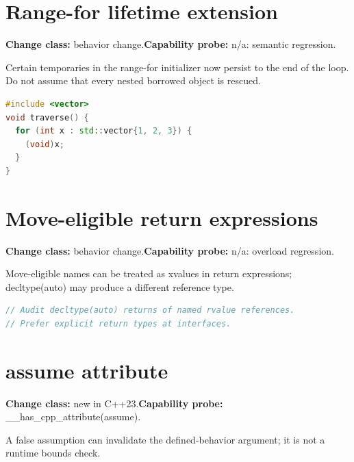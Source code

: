 \documentclass[11pt]{article}
\begin{document}
\section{Range-for lifetime extension}
\textbf{Change class:} behavior change.\quad \textbf{Capability probe:} n/a: semantic regression.

Certain temporaries in the range-for initializer now persist to the end of the loop. Do not assume that every nested borrowed object is rescued.

\begin{lstlisting}[language=C++]
#include <vector>
void traverse() {
  for (int x : std::vector{1, 2, 3}) {
    (void)x;
  }
}
\end{lstlisting}
\section{Move-eligible return expressions}
\textbf{Change class:} behavior change.\quad \textbf{Capability probe:} n/a: overload regression.

Move-eligible names can be treated as xvalues in return expressions; decltype(auto) may produce a different reference type.

\begin{lstlisting}[language=C++]
// Audit decltype(auto) returns of named rvalue references.
// Prefer explicit return types at interfaces.
\end{lstlisting}
\section{assume attribute}
\textbf{Change class:} new in C++23.\quad \textbf{Capability probe:} \_\_has\_cpp\_attribute(assume).

A false assumption can invalidate the defined-behavior argument; it is not a runtime bounds check.
\end{document}
